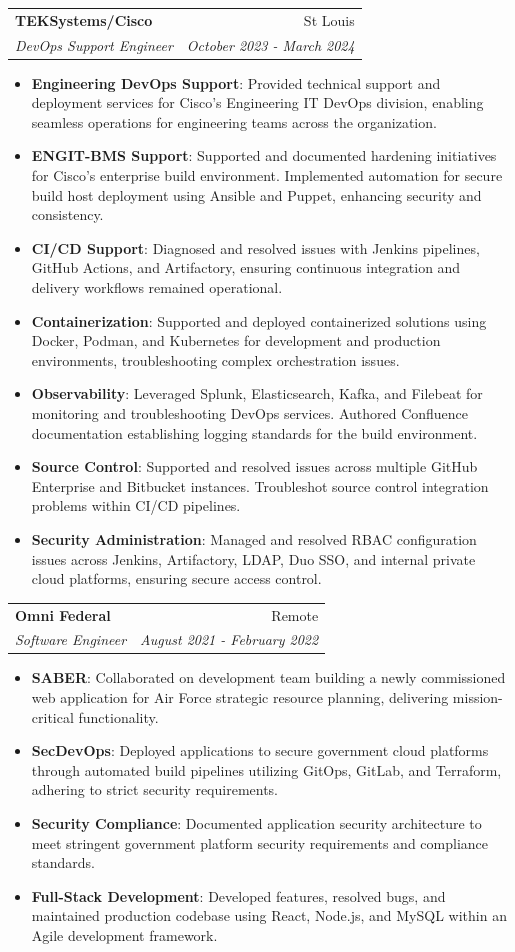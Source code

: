 \documentclass[letterpaper,11pt]{article}
\makeatletter
\newcommand{\resumeItem}[2]{
  \item\small{
    \textbf{#1}{: #2 \vspace{-2pt}}
  }
}
\newcommand{\resumeSubheading}[4]{
  \vspace{-1pt}\item
    \begin{tabular*}{0.97\textwidth}[t]{l@{\extracolsep{\fill}}r}
      \textbf{#1} & #2 \\
      \textit{\small#3} & \textit{\small #4} \\
    \end{tabular*}\vspace{-5pt}
}
\newcommand{\resumeItemListStart}{\begin{itemize}}
\newcommand{\resumeItemListEnd}{\end{itemize}\vspace{-5pt}}
\makeatother
\begin{document}
    \resumeSubheading
      {TEKSystems/Cisco}{St Louis}
      {DevOps Support Engineer}{October 2023 - March 2024}
      \resumeItemListStart
        \resumeItem{Engineering DevOps Support}{Provided technical support and deployment services for Cisco's Engineering IT DevOps division, enabling seamless operations for engineering teams across the organization.}
        \resumeItem{ENGIT-BMS Support}{Supported and documented hardening initiatives for Cisco's enterprise build environment. Implemented automation for secure build host deployment using Ansible and Puppet, enhancing security and consistency.}
        \resumeItem{CI/CD Support}{Diagnosed and resolved issues with Jenkins pipelines, GitHub Actions, and Artifactory, ensuring continuous integration and delivery workflows remained operational.}
        \resumeItem{Containerization}{Supported and deployed containerized solutions using Docker, Podman, and Kubernetes for development and production environments, troubleshooting complex orchestration issues.}
        \resumeItem{Observability}{Leveraged Splunk, Elasticsearch, Kafka, and Filebeat for monitoring and troubleshooting DevOps services. Authored Confluence documentation establishing logging standards for the build environment.}
        \resumeItem{Source Control}{Supported and resolved issues across multiple GitHub Enterprise and Bitbucket instances. Troubleshot source control integration problems within CI/CD pipelines.}
        \resumeItem{Security Administration}{Managed and resolved RBAC configuration issues across Jenkins, Artifactory, LDAP, Duo SSO, and internal private cloud platforms, ensuring secure access control.}
    \resumeItemListEnd
    \resumeSubheading
      {Omni Federal}{Remote}
      {Software Engineer}{August 2021 - February 2022}
      \resumeItemListStart
        \resumeItem{SABER}{Collaborated on development team building a newly commissioned web application for Air Force strategic resource planning, delivering mission-critical functionality.}
        \resumeItem{SecDevOps}{Deployed applications to secure government cloud platforms through automated build pipelines utilizing GitOps, GitLab, and Terraform, adhering to strict security requirements.}
        \resumeItem{Security Compliance}{Documented application security architecture to meet stringent government platform security requirements and compliance standards.}
        \resumeItem{Full-Stack Development}{Developed features, resolved bugs, and maintained production codebase using React, Node.js, and MySQL within an Agile development framework.}
      \resumeItemListEnd
\end{document}
